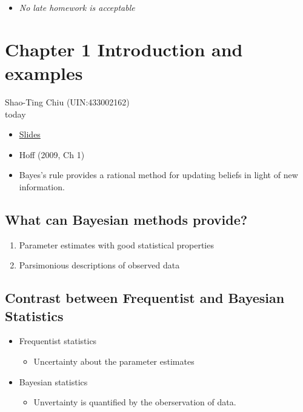 \documentclass[
  letterpaper,
  DIV=11,
  numbers=noendperiod]{scrreprt}
\providecommand{\tightlist}{%
  \setlength{\itemsep}{0pt}\setlength{\parskip}{0pt}}\usepackage{longtable,booktabs,array}
\begin{document}
\begin{itemize}
\tightlist
\item
  \emph{No late homework is acceptable}
\end{itemize}


\hypertarget{chapter-1-introduction-and-examples}{%
\chapter{Chapter 1 Introduction and
examples}\label{chapter-1-introduction-and-examples}}

Shao-Ting Chiu (UIN:433002162)\\
today

\hfill\break

\begin{itemize}
\item
  \href{https://tamucs-my.sharepoint.com/:b:/r/personal/stchiu_tamu_edu/Documents/2022Fall/STAT638_BayesMethod/chap01.pdf?csf=1\&web=1\&e=lX1sgw}{Slides}
\item
  Hoff (2009, Ch 1)
\item
  Bayes's rule provides a rational method for updating beliefs in light
  of new information.
\end{itemize}

\hypertarget{what-can-bayesian-methods-provide}{%
\section{What can Bayesian methods
provide?}\label{what-can-bayesian-methods-provide}}

\begin{enumerate}
\def\labelenumi{\arabic{enumi}.}
\tightlist
\item
  Parameter estimates with good statistical properties
\item
  Parsimonious descriptions of observed data
\end{enumerate}

\hypertarget{contrast-between-frequentist-and-bayesian-statistics}{%
\section{Contrast between Frequentist and Bayesian
Statistics}\label{contrast-between-frequentist-and-bayesian-statistics}}

\begin{itemize}
\tightlist
\item
  Frequentist statistics

  \begin{itemize}
  \tightlist
  \item
    Uncertainty about the parameter estimates
  \end{itemize}
\item
  Bayesian statistics

  \begin{itemize}
  \tightlist
  \item
    Unvertainty is quantified by the oberservation of data.
  \end{itemize}
\end{itemize}
\end{document}
